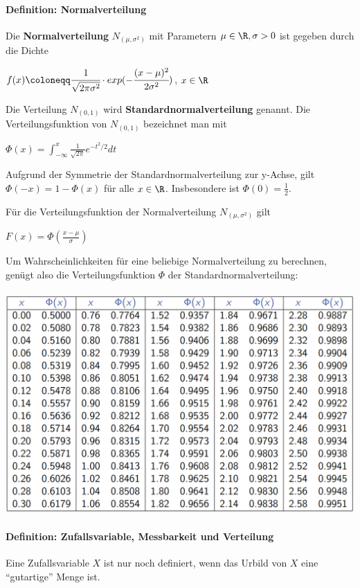 \paragraph{Definition: Normalverteilung}
Die \textbf{Normalverteilung} $N_{(\mu,\sigma^2)}$ mit Parametern $\mu\in\R,\sigma>0$ ist gegeben durch die Dichte
\begin{tightcenter}
	$f(x)\coloneqq\cfrac{1}{\sqrt{2\pi\sigma^2}}\cdot exp(-\cfrac{(x-\mu)^2}{2\sigma^2})$, \qquad$x\in\R$
\end{tightcenter}
Die Verteilung $N_{(0,1)}$ wird \textbf{Standardnormalverteilung} genannt.
Die Verteilungsfunktion von $N_{(0,1)}$ bezeichnet man mit
\begin{tightcenter}
	$\Phi(x)=\int_{-\infty}^{x}\frac{1}{\sqrt{2\pi}}e^{-t^2/2}dt$
\end{tightcenter}
Aufgrund der Symmetrie der Standardnormalverteilung zur y-Achse, gilt\\ $\Phi(-x)=1-\Phi(x)$ für alle $x\in\R$.
Insbesondere ist $\Phi(0)=\frac{1}{2}$.

Für die Verteilungsfunktion der Normalverteilung $N_{(\mu,\sigma^2)}$ gilt
\begin{tightcenter}
	$F(x)=\Phi(\frac{x-\mu}{\sigma})$
\end{tightcenter}
Um Wahrscheinlichkeiten für eine beliebige Normalverteilung zu berechnen, genügt also die Verteilungsfunktion $\Phi$ der Standardnormalverteilung:\\\\
\includegraphics[width=\textwidth]{images/image2.png}

\paragraph{Definition: Zufallsvariable, Messbarkeit und Verteilung}
Eine Zufallsvariable $X$ ist nur noch definiert, wenn das Urbild von $X$ eine \enquote{gutartige} Menge ist.

